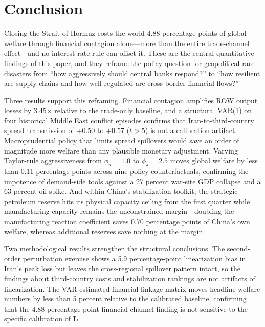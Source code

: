 \documentclass[12pt]{article}
\begin{document}

\section{Conclusion}
\label{sec:conclusion}

Closing the Strait of Hormuz costs the world 4.88 percentage points of global welfare through financial contagion alone---more than the entire trade-channel effect---and no interest-rate rule can offset it. These are the central quantitative findings of this paper, and they reframe the policy question for geopolitical rare disasters from ``how aggressively should central banks respond?'' to ``how resilient are supply chains and how well-regulated are cross-border financial flows?''

Three results support this reframing. Financial contagion amplifies ROW output losses by 3.45$\times$ relative to the trade-only baseline, and a structural VAR(1) on four historical Middle East conflict episodes confirms that Iran-to-third-country spread transmission of $+0.50$ to $+0.57$ ($t > 5$) is not a calibration artifact. Macroprudential policy that limits spread spillovers would save an order of magnitude more welfare than any plausible monetary adjustment. Varying Taylor-rule aggressiveness from $\phi_\pi = 1.0$ to $\phi_\pi = 2.5$ moves global welfare by less than 0.11 percentage points across nine policy counterfactuals, confirming the impotence of demand-side tools against a 27 percent war-site GDP collapse and a 63 percent oil spike. And within China's stabilization toolkit, the strategic petroleum reserve hits its physical capacity ceiling from the first quarter while manufacturing capacity remains the unconstrained margin---doubling the manufacturing reaction coefficient saves 0.70 percentage points of China's own welfare, whereas additional reserves save nothing at the margin.

Two methodological results strengthen the structural conclusions. The second-order perturbation exercise shows a 5.9 percentage-point linearization bias in Iran's peak loss but leaves the cross-regional spillover pattern intact, so the findings about third-country costs and stabilization rankings are not artifacts of linearization. The VAR-estimated financial linkage matrix moves headline welfare numbers by less than 5 percent relative to the calibrated baseline, confirming that the 4.88 percentage-point financial-channel finding is not sensitive to the specific calibration of $\mathbf{L}$.
\end{document}

